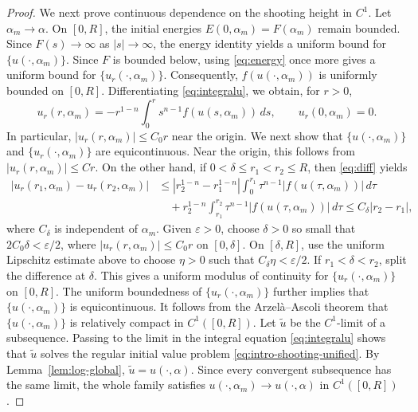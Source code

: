 \documentclass[11pt]{article}
\begin{document}
\begin{proof}
We next prove continuous dependence on the shooting height in $C^1$. Let $\alpha_m\to\alpha$. On $[0,R]$,  the initial energies $E(0,\alpha_m)=F(\alpha_m)$ remain bounded. Since $F(s)\to\infty$ as $|s|\to\infty$, the energy identity yields a uniform bound for $\{u(\cdot,\alpha_m)\}$. Since $F$ is bounded below, using \eqref{eq:energy} once more gives a uniform bound for $\{u_r(\cdot,\alpha_m)\}$. Consequently, $f(u(\cdot,\alpha_m))$ is uniformly bounded on $[0,R]$. Differentiating \eqref{eq:integralu}, we obtain, for $r>0$,
\begin{equation}\label{eq:diff}
  u_r(r,\alpha_m)=-r^{1-n}\int_0^r s^{n-1}f(u(s,\alpha_m))\,ds,
 \qquad u_r(0,\alpha_m)=0.
\end{equation}
In particular, $|u_r(r,\alpha_m)|\le C_0r$ near the origin.
We next show that $\{u(\cdot,\alpha_m)\}$ and $\{u_r(\cdot,\alpha_m)\}$ are  equicontinuous. Near the origin, this follows from $|u_r(r,\alpha_m)|\le Cr$. On the other hand, if $0<\delta\leq r_1<r_2\leq R$, then \eqref{eq:diff} yields
\[
\begin{aligned}
 |u_r(r_1,\alpha_m)-u_r(r_2,\alpha_m)|
 &\leq \left|r_2^{1-n}-r_1^{1-n}\right|
       \int_0^{r_1}\tau^{n-1}|f(u(\tau,\alpha_m))|\,d\tau  \\
 &\quad +r_2^{1-n}\int_{r_1}^{r_2}\tau^{n-1}|f(u(\tau,\alpha_m))|\,d\tau
 \leq C_\delta |r_2-r_1|,
\end{aligned}
\]
where $C_\delta$ is independent of $\alpha_m$. {Given $\varepsilon>0$, choose $\delta>0$ so small that
$2C_0\delta<\varepsilon/2$, where $|u_r(r,\alpha_m)|\le C_0r$ on
$[0,\delta]$.  On $[\delta,R]$, use the uniform Lipschitz estimate
above to choose $\eta>0$ such that
$C_\delta\eta<\varepsilon/2$.  If $r_1<\delta<r_2$, split the
difference at $\delta$.  This gives a uniform modulus of continuity
for $\{u_r(\cdot,\alpha_m)\}$ on $[0,R]$.} The uniform boundedness of $\{u_r(\cdot,\alpha_m)\}$ further implies that $\{u(\cdot,\alpha_m)\}$ is equicontinuous.
It follows from the Arzel\`{a}--Ascoli theorem that $\{u(\cdot,\alpha_m)\}$ is
relatively compact in $C^1([0,R])$. Let $\tilde u$ be the $C^1$-limit of
a subsequence. Passing to the limit in the integral equation \eqref{eq:integralu} shows that $\tilde u$ solves the regular initial value problem \eqref{eq:intro-shooting-unified}. By Lemma~\ref{lem:log-global}, $\tilde u=u(\cdot,\alpha)$. Since every convergent subsequence has the same limit, the whole family satisfies  $u(\cdot,\alpha_m)\rightarrow u(\cdot,\alpha)$ in $C^1([0,R])$.


\end{proof}
\end{document}
